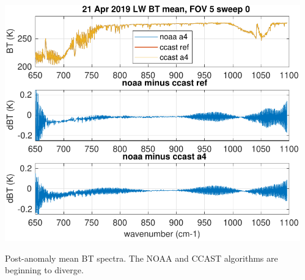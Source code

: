 \documentclass[10pt]{beamer}
\begin{document}
\begin{frame}
\begin{columns}[t]
\begin{column}{0.5\textwidth}
\end{column}
\begin{column}{0.5\textwidth}  
  \begin{centering}
  \includegraphics[width=\textwidth]{figures/LW_MW_fail_BT_fov5_sd0.pdf}
  \end{centering}\vspace{3mm}
  Post-anomaly mean BT spectra.  The NOAA and CCAST algorithms are
  beginning to diverge.

\end{column}
\end{columns}
\end{frame}
\end{document}
